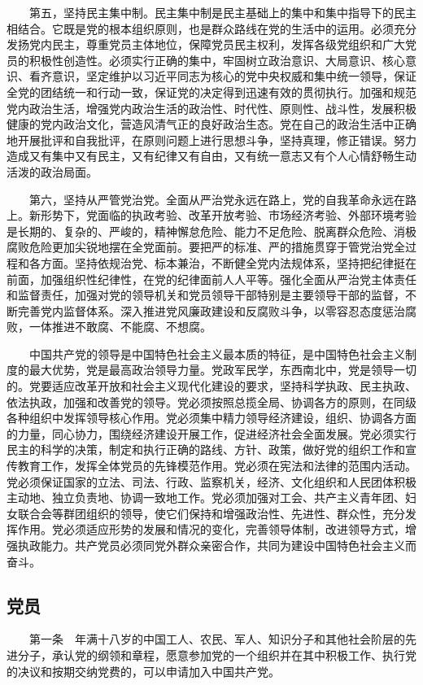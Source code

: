 　　第五，坚持民主集中制。民主集中制是民主基础上的集中和集中指导下的民主相结合。它既是党的根本组织原则，也是群众路线在党的生活中的运用。必须充分发扬党内民主，尊重党员主体地位，保障党员民主权利，发挥各级党组织和广大党员的积极性创造性。必须实行正确的集中，牢固树立政治意识、大局意识、核心意识、看齐意识，坚定维护以习近平同志为核心的党中央权威和集中统一领导，保证全党的团结统一和行动一致，保证党的决定得到迅速有效的贯彻执行。加强和规范党内政治生活，增强党内政治生活的政治性、时代性、原则性、战斗性，发展积极健康的党内政治文化，营造风清气正的良好政治生态。党在自己的政治生活中正确地开展批评和自我批评，在原则问题上进行思想斗争，坚持真理，修正错误。努力造成又有集中又有民主，又有纪律又有自由，又有统一意志又有个人心情舒畅生动活泼的政治局面。

　　第六，坚持从严管党治党。全面从严治党永远在路上，党的自我革命永远在路上。新形势下，党面临的执政考验、改革开放考验、市场经济考验、外部环境考验是长期的、复杂的、严峻的，精神懈怠危险、能力不足危险、脱离群众危险、消极腐败危险更加尖锐地摆在全党面前。要把严的标准、严的措施贯穿于管党治党全过程和各方面。坚持依规治党、标本兼治，不断健全党内法规体系，坚持把纪律挺在前面，加强组织性纪律性，在党的纪律面前人人平等。强化全面从严治党主体责任和监督责任，加强对党的领导机关和党员领导干部特别是主要领导干部的监督，不断完善党内监督体系。深入推进党风廉政建设和反腐败斗争，以零容忍态度惩治腐败，一体推进不敢腐、不能腐、不想腐。

　　中国共产党的领导是中国特色社会主义最本质的特征，是中国特色社会主义制度的最大优势，党是最高政治领导力量。党政军民学，东西南北中，党是领导一切的。党要适应改革开放和社会主义现代化建设的要求，坚持科学执政、民主执政、依法执政，加强和改善党的领导。党必须按照总揽全局、协调各方的原则，在同级各种组织中发挥领导核心作用。党必须集中精力领导经济建设，组织、协调各方面的力量，同心协力，围绕经济建设开展工作，促进经济社会全面发展。党必须实行民主的科学的决策，制定和执行正确的路线、方针、政策，做好党的组织工作和宣传教育工作，发挥全体党员的先锋模范作用。党必须在宪法和法律的范围内活动。党必须保证国家的立法、司法、行政、监察机关，经济、文化组织和人民团体积极主动地、独立负责地、协调一致地工作。党必须加强对工会、共产主义青年团、妇女联合会等群团组织的领导，使它们保持和增强政治性、先进性、群众性，充分发挥作用。党必须适应形势的发展和情况的变化，完善领导体制，改进领导方式，增强执政能力。共产党员必须同党外群众亲密合作，共同为建设中国特色社会主义而奋斗。

    \subsection{党员}
　　第一条　年满十八岁的中国工人、农民、军人、知识分子和其他社会阶层的先进分子，承认党的纲领和章程，愿意参加党的一个组织并在其中积极工作、执行党的决议和按期交纳党费的，可以申请加入中国共产党。

